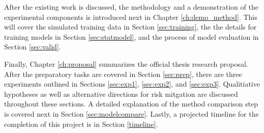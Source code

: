 After the existing work is discussed, the methodology and a demonstration of
the experimental components is introduced next in Chapter \ref{ch:demo_method}.
This will cover the simulated training data in Section \ref{sec:training}, the
the details for training models in Section \ref{sec:statmodel}, and the
process of model evaluation in Section \ref{sec:valid}.  

Finally, Chapter \ref{ch:proposal} summarizes the official thesis research
proposal. After the preparatory tasks are covered in Section \ref{sec:prep},
there are three experiments outlined in Sections \ref{sec:exp1},
\ref{sec:exp2}, and \ref{sec:exp3}. Qualitiative hypotheses as well as
alternative directions for risk mitgation are discussed throughout these
sections.  A detailed explanation of the method comparison step is covered next
in Section \ref{sec:modelcompare}.  Lastly, a projected timeline for the
completion of this project is in Section \ref{timeline}.
